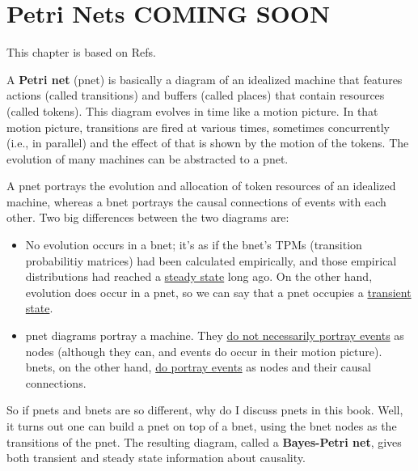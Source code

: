 \chapter{Petri Nets COMING SOON}
\label{petri}




\newcommand{\petriar}[3]{{\ar@{.>}@/_1pc/[#1]|*++[o][F-]{#2}
\ar[#1]
\ar@{<.}@/^1pc/[#1]|*++[o][F-]{#3}
}}

\newcommand{\petriarDR}[3]{\ar@[red]@{->}@/_1pc/[#1]|*++[o][F-]{#2}
\ar[#1]
\ar@{<.}@/^1pc/[#1]|*++[o][F-]{#3}
}

\newcommand{\petriarUR}[3]{\ar@{.>}@/_1pc/[#1]|*++[o][F-]{#2}
\ar[#1]
\ar@[red]@{<-}@/^1pc/[#1]|*++[o][F-]{#3}
}
This chapter
is based on Refs.

A {\bf Petri net} (pnet)
is basically a diagram of an 
idealized machine that 
features actions (called transitions)
and
buffers (called places)
that contain resources (called tokens).
This diagram evolves in time like a motion picture.  In that motion picture, transitions are fired at various times, sometimes concurrently (i.e., in parallel) and the effect of that is shown  by the motion of the tokens. The evolution of many
 machines can be abstracted
to a pnet.

A pnet  portrays the evolution and allocation of token resources of
an idealized machine, whereas 
a bnet 
portrays the causal connections of events with each other. 
Two big differences between the two diagrams  are:

\begin{itemize}
\item No evolution occurs in a bnet; it's as if the
bnet's TPMs (transition probabilitiy matrices) had been calculated empirically, and those empirical distributions
had reached a \ul{steady state} long ago.
On the other hand, evolution does occur in a pnet, so
we can say that a pnet  occupies a \ul{ transient state}.
\item pnet diagrams portray a machine. They \ul{do not necessarily portray events} as nodes (although they can, and events do occur in their motion picture). bnets, on the
other hand,  \ul{do portray  events} as nodes and
their causal connections.

\end{itemize}

So if pnets and bnets are so different,
why do I discuss pnets in this book. Well,
it turns out one can build a pnet
on top of a bnet, using the bnet nodes
as the transitions of the pnet. The 
resulting diagram,
called  a {\bf Bayes-Petri net},
gives both transient and steady state 
information about causality.

